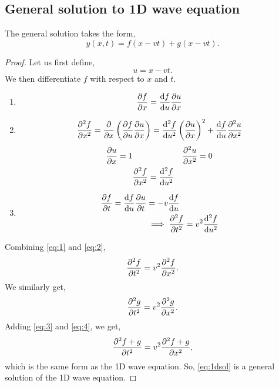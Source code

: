 \documentclass{book}
\begin{document}
\subsection{General solution to 1D wave equation}
The general solution takes the form,
\begin{equation}
    y(x,t) = f(x-vt) + g(x-vt)\label{eq:1dsol}.
\end{equation}
\begin{proof}
    Let us first define,
    \begin{equation}
        u = x - vt.
    \end{equation}
    We then differentiate $f$ with respect to $x$ and $t$.
    \begin{enumerate}
        \item \begin{equation}
            \pdv{f}{x} = \dv{f}{u}\pdv{u}{x}
        \end{equation}
        \item \begin{equation}
            \pdv[2]{f}{x} = \pdv{}{x}\left(\pdv{f}{u}\pdv{u}{x}\right) = \dv[2]{f}{u}\left(\pdv{u}{x}\right)^2 + \dv{f}{u}\pdv[2]{u}{x}
        \end{equation}
        \begin{align}
            \pdv{u}{x} = 1 && \pdv[2]{u}{x}=0\\
            &\pdv[2]{f}{x} = \dv[2]{f}{u}& \label{eq:2}
        \end{align}
        \item \begin{equation}
            \begin{split}
                \pdv{f}{t} = \dv{f}{u}\pdv{u}{t} & = -v\dv{f}{u} \\
                & \implies \pdv[2]{f}{t} = v^2 \dv[2]{f}{u} \label{eq:1}
            \end{split}
        \end{equation}
    \end{enumerate}
    Combining \eqref{eq:1} and \eqref{eq:2},
    \begin{equation}
        \pdv[2]{f}{t} = v^2\pdv[2]{f}{x}. \label{eq:3}
    \end{equation}
    We similarly get,
    \begin{equation}
        \pdv[2]{g}{t} = v^2\pdv[2]{g}{x}. \label{eq:4}
    \end{equation}
    Adding \eqref{eq:3} and \eqref{eq:4}, we get,
    \begin{equation}
        \pdv[2]{f+g}{t}= v^2\pdv[2]{f+g}{x},
    \end{equation}
    which is the same form as the 1D wave equation. So, \eqref{eq:1dsol} is a general solution of the 1D wave equation.
\end{proof}
\end{document}
